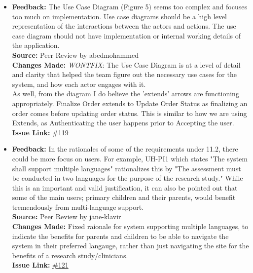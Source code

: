 \documentclass{article}
\begin{document}
\begin{itemize}

  \item 
    \textbf{Feedback:} The Use Case Diagram (Figure 5) seems too complex and focuses too much on implementation. Use case diagrams should be a high level representation of the interactions between the actors and actions. The use case diagram should not have implementation or internal working details of the application. \\
    \textbf{Source:} Peer Review by abedmohammed\\
    \textbf{Changes Made:} \textit{WONTFIX}: The Use Case Diagram is at a level of detail and clarity that helped the team figure out the necessary use cases for the system, and how each actor engages with it.\\
    As well, from the diagram I do believe the 'extends' arrows are functioning appropriately. Finalize Order extends to Update Order Status as finalizing an order comes before updating order status. This is similar to how we are using Extends, as Authenticating the user happens prior to Accepting the user.\\
    \textbf{Issue Link:} \href{https://github.com/parishanizam/TeleHealth/issues/119}{\#119}
  
  \item 
    \textbf{Feedback:} In the rationales of some of the requirements under 11.2, there could be more focus on users. For example, UH-PI1 which states "The system shall support multiple languages" rationalizes this by "The assessment must be conducted in two languages for the purpose of the research study." While this is an important and valid justification, it can also be pointed out that some of the main users; primary children and their parents, would benefit tremendously from multi-language support. \\
    \textbf{Source:} Peer Review by jane-klavir\\
    \textbf{Changes Made:} Fixed raionale for system supporting multiple languages, to indicate the benefits for parents and children to be able to navigate the system in their preferred langauge, rather than just navigating the site for the benefits of a research study/clinicians.\\
    \textbf{Issue Link:} \href{https://github.com/parishanizam/TeleHealth/issues/121}{\#121}
  

\end{itemize}
\end{document}
